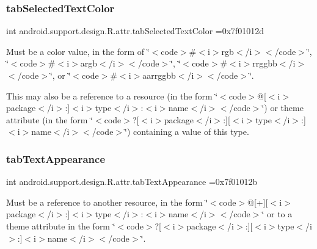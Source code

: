 \subsubsection{\texorpdfstring{tab\+Selected\+Text\+Color}{tabSelectedTextColor}}
{\footnotesize\ttfamily int android.\+support.\+design.\+R.\+attr.\+tab\+Selected\+Text\+Color =0x7f01012d\hspace{0.3cm}{\ttfamily [static]}}

Must be a color value, in the form of \char`\"{}$<$code$>$\#$<$i$>$rgb$<$/i$>$$<$/code$>$\char`\"{}, \char`\"{}$<$code$>$\#$<$i$>$argb$<$/i$>$$<$/code$>$\char`\"{}, \char`\"{}$<$code$>$\#$<$i$>$rrggbb$<$/i$>$$<$/code$>$\char`\"{}, or \char`\"{}$<$code$>$\#$<$i$>$aarrggbb$<$/i$>$$<$/code$>$\char`\"{}. 

This may also be a reference to a resource (in the form \char`\"{}$<$code$>$@\mbox{[}$<$i$>$package$<$/i$>$\+:\mbox{]}$<$i$>$type$<$/i$>$\+:$<$i$>$name$<$/i$>$$<$/code$>$\char`\"{}) or theme attribute (in the form \char`\"{}$<$code$>$?\mbox{[}$<$i$>$package$<$/i$>$\+:\mbox{]}\mbox{[}$<$i$>$type$<$/i$>$\+:\mbox{]}$<$i$>$name$<$/i$>$$<$/code$>$\char`\"{}) containing a value of this type. \mbox{\label{classandroid_1_1support_1_1design_1_1R_1_1attr_a9f7da107b74efc58026aa10f8acfd26c}} 
\subsubsection{\texorpdfstring{tab\+Text\+Appearance}{tabTextAppearance}}
{\footnotesize\ttfamily int android.\+support.\+design.\+R.\+attr.\+tab\+Text\+Appearance =0x7f01012b\hspace{0.3cm}{\ttfamily [static]}}

Must be a reference to another resource, in the form \char`\"{}$<$code$>$@\mbox{[}+\mbox{]}\mbox{[}$<$i$>$package$<$/i$>$\+:\mbox{]}$<$i$>$type$<$/i$>$\+:$<$i$>$name$<$/i$>$$<$/code$>$\char`\"{} or to a theme attribute in the form \char`\"{}$<$code$>$?\mbox{[}$<$i$>$package$<$/i$>$\+:\mbox{]}\mbox{[}$<$i$>$type$<$/i$>$\+:\mbox{]}$<$i$>$name$<$/i$>$$<$/code$>$\char`\"{}. \mbox{\label{classandroid_1_1support_1_1design_1_1R_1_1attr_ab79720c0734d6fa212a2e7530837aa6e}} 
